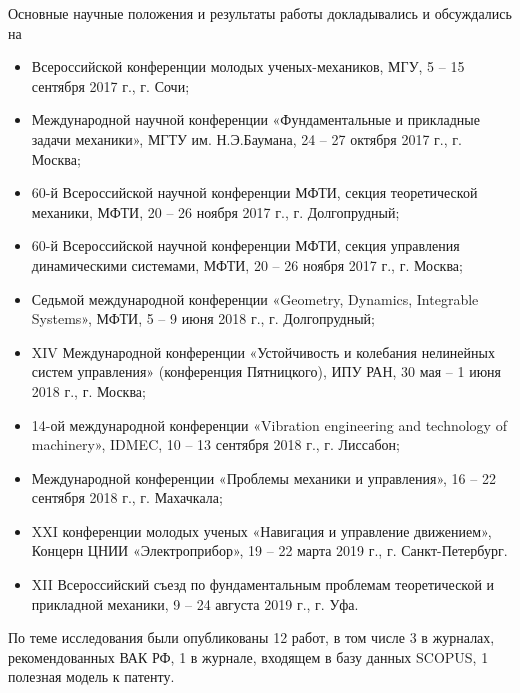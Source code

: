 Основные научные положения и результаты работы докладывались и обсуждались на 
\begin{itemize}
\item Всероссийской конференции молодых ученых-механиков, МГУ, 5 -- 15 сентября 2017 г., г. Сочи;
\item Международной научной конференции «Фундаментальные и прикладные задачи механики», МГТУ им. Н.Э.Баумана, 24 -- 27 октября 2017 г., г. Москва;
\item 60-й Всероссийской научной конференции МФТИ, секция теоретической механики, МФТИ, 20 -- 26 ноября 2017 г., г. Долгопрудный;
\item 60-й Всероссийской научной конференции МФТИ, секция управления динамическими системами, МФТИ, 20 -- 26 ноября 2017 г., г. Москва;
\item Седьмой международной конференции «Geometry, Dynamics, Integrable Systems», МФТИ, 5 -- 9 июня 2018 г., г. Долгопрудный;
\item XIV Международной конференции «Устойчивость и колебания нелинейных систем управления» (конференция Пятницкого), ИПУ РАН, 30 мая -- 1 июня 2018 г., г. Москва;
\item 14-ой международной конференции «Vibration engineering and technology of machinery», IDMEC,  10 -- 13 сентября 2018 г., г. Лиссабон;
\item Международной конференции «Проблемы механики и управления», 16 -- 22 сентября 2018 г., г. Махачкала;
\item XXI конференции молодых ученых «Навигация и управление движением», Концерн ЦНИИ «Электроприбор», 19 -- 22 марта 2019 г., г. Санкт-Петербург.
\item XII Всероссийский съезд по фундаментальным проблемам теоретической и прикладной механики, 9 -- 24 августа 2019 г., г. Уфа.
\end{itemize}
По теме исследования были опубликованы 12 работ, в том числе 3 в журналах, рекомендованных ВАК РФ, 1 в журнале, входящем в базу данных SCOPUS, 1 полезная модель к патенту.

